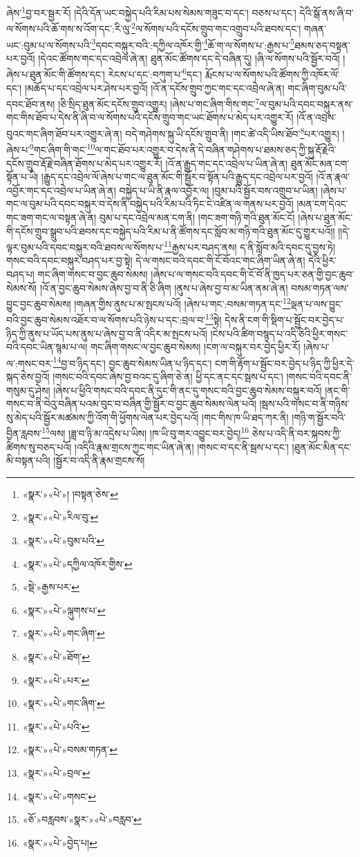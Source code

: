 ཞེས་\footnote{«སྣར་»«པེ་»། །བསྟན་ཅེས་}བྱ་བར་སྦྱར་རོ། །དེའི་དོན་ཡང་བསྐྱེད་པའི་རིམ་པས་སེམས་གཟུང་བ་དང་། བཅས་པ་དང་། དེའི་སྒོ་ནས་ཞི་བ་ལ་སོགས་པའི་ཆོ་གས་ས་འོག་དང་:རི་ལུ་\footnote{«སྣར་»«པེ་»རིལ་བུ་}ལ་སོགས་པའི་དངོས་གྲུབ་གང་འགྲུབ་པའི་ཐབས་དང་། གཞན་ཡང་:བུམ་པ་ལ་སོགས་པའི་\footnote{«སྣར་»«པེ་»བུམ་པའི་}དབང་བསྐུར་བའི་:དཀྱིལ་འཁོར་གྱི་\footnote{«སྣར་»«པེ་»དཀྱིལ་འཁོར་གྱིས་}ཆོ་ག་ལ་སོགས་པ་:རྒྱས་པ་\footnote{«སྡེ་»རྒྱས་པར་}ཐམས་ཅད་བསྟན་པར་བྱའོ། །དེའང་ཚོགས་གང་དང་འབྲེལ་ཞེ་ན། ཐུན་མོང་ཚོགས་དང་དེ་བཞིན་དུ། །ཞི་ལ་སོགས་པའི་སྦྱོར་བའོ། །ཞེས་པ་ཐུན་མོང་གི་ཚོགས་དང་། རེངས་པ་དང་:བཀུག་པ་\footnote{«སྣར་»«པེ་»ལྐུགས་པ་}དང་། རྨོངས་པ་ལ་སོགས་པའི་ཚོགས་ཀྱི་འཁོར་ལོ་དང་། །མཆོད་པ་དང་འབྲེལ་པར་ཤེས་པར་བྱའོ། །འོ་ན་དངོས་གྲུབ་ཀྱང་གང་དང་འབྲེལ་ཞེ་ན། གང་ཞིག་བུམ་པའི་དབང་ཐོབ་ནས། །ཅི་སྲིད་ཐུན་མོང་དངོས་གྲུབ་འགྱུར། །ཞེས་པ་གང་ཞིག་གིས་གང་\footnote{«སྣར་»«པེ་»གང་ཞིག་}ལ་བུམ་པའི་དབང་བསྐུར་ནས་གང་གིས་ཐོབ་པ་དེས་ནི་ཞི་བ་ལ་སོགས་པའི་དངོས་གྲུབ་གང་ཡང་ཐོགས་པ་མེད་པར་འགྱུར་རོ། །འོ་ན་འབྲས་བུའང་གང་ཞིག་ཐོབ་པར་འགྱུར་ཞེ་ན། བདེ་གཤེགས་སྐུ་ཡི་དངོས་གྲུབ་ནི། །གང་ཚེ་འདི་ཡིས་ཐོབ་\footnote{«སྣར་»«པེ་»ཐོག་}པར་འགྱུར། །ཞེས་པ་\footnote{«སྣར་»«པེ་»པར་}གང་ཞིག་གི་གང་\footnote{«སྣར་»«པེ་»གང་ཞིག་}ལ་གང་ཐོབ་པར་འགྱུར་བ་དེས་ནི་དེ་བཞིན་གཤེགས་པ་ཐམས་ཅད་ཀྱི་སྐུ་རྡོ་རྗེའི་དངོས་གྲུབ་རྡོ་རྗེ་བཞིན་ཐོགས་པ་མེད་པར་འགྱུར་རོ། །འོ་ན་རྒྱུད་གང་དང་འབྲེལ་པ་ཡིན་ཞེ་ན། ཐུན་མོང་མན་ངག་སྟོན་པ་ཡི། །རྒྱུད་དང་འབྲེལ་ལོ་ཞེས་པ་གང་ལ་ཐུན་མོང་གི་སྦྱོར་བ་སྟོན་པའི་རྒྱུད་དང་འབྲེལ་པར་བྱའོ། །འོ་ན་རྣལ་འབྱོར་གང་དང་འབྲེལ་པ་ཡིན་ཞེ་ན། བསྐྱེད་པ་ཡི་ནི་རྣལ་འབྱོར་ལ། །བུམ་པའི་སྦྱོར་བས་འགྲུབ་པ་ཡིན། །ཞེས་པ་གང་ལ་བུམ་པའི་དབང་བསྐུར་བ་དེས་ནི་བསྐྱེད་པའི་རིམ་པའི་ཏིང་ངེ་འཛིན་ལ་གནས་པར་བྱའོ། །མན་ངག་དེའང་གང་ཟག་གང་ལ་བསྟན་ཞེ་ན། བུམ་པ་དང་འབྲེལ་མན་ངག་ནི། །གང་ཟག་གཉི་གའི་ཐུན་མོང་ངོ། །ཞེས་པ་ཐུན་མོང་གི་དངོས་གྲུབ་སྒྲུབ་པའི་ཐབས་དང་བསྐྱེད་པའི་རིམ་པ་ནི་ཚོགས་དང་སློབ་མ་གཉི་གའི་ཐུན་མོང་དུ་གྱུར་པའོ།། །།དེ་ལྟར་བུམ་པའི་དབང་བསྐུར་བའི་ཐབས་ལ་སོགས་པ་\footnote{«སྣར་»«པེ་»པའི་}རྒྱས་པར་བཤད་ནས། ད་ནི་སློབ་མའི་དབང་དུ་བྱས་ཏེ། གསང་བའི་དབང་བསྐུར་བཤད་པར་བྱ་སྟེ། དེ་ལ་གསང་བའི་དབང་གི་ངོ་བོའང་གང་ཞིག་ཡིན་ཞེ་ན། དེའི་ཕྱིར་བཤད་པ། གང་ཞིག་གསང་བ་བྱང་ཆུབ་སེམས། །ཞེས་པ་ལ་གསང་བའི་དབང་གི་ངོ་བོ་ནི་ཁྱད་པར་ཅན་གྱི་བྱང་ཆུབ་སེམས་སོ། །འོ་ན་བྱང་ཆུབ་སེམས་ཞེས་བྱ་བ་ནི་ཅི་ཞིག །ནུས་པ་ཞེས་བྱ་བ་མ་ཡིན་ནམ་ཞེ་ན། བསམ་གཏན་ལས་བྱུང་བྱང་ཆུབ་སེམས། །གཞན་གྱིས་ནུས་པ་མ་སྤངས་པའོ། །ཞེས་པ་གང་:བསམ་གཏན་དང་\footnote{«སྣར་»«པེ་»བསམ་གཏན་}ལྡན་པ་ལས་བྱུང་བའི་བྱང་ཆུབ་སེམས་འཐོར་བ་ལ་སོགས་པའི་ཉེས་པ་དང་:བྲལ་བ་\footnote{«སྣར་»«པེ་»བྲལ་}སྟེ། དེས་ནི་ངག་གི་སྡིག་པ་སྦྱོང་བར་བྱེད་པ་ཉིད་ཀྱི་ནུས་པ་ཡོད་པས་ནུས་པ་ཞེས་བྱ་བ་ནི་འདིར་མ་སྤངས་པའོ། །ངེས་པའི་ཚིག་བསྙད་པ་འདི་ཅིའི་ཕྱིར་གསང་བའི་དབང་ཡིན་སྙམ་པ་ལ། གང་ཞིག་གསང་ལ་བྱང་ཆུབ་སེམས། །ངག་ལ་བསྐུར་བར་བྱེད་ཕྱིར་རོ། །ཞེས་པ་ལ་:གསང་བར་\footnote{«སྣར་»«པེ་»གསང་}བྱ་བ་ཉིད་དང་། བྱང་ཆུབ་སེམས་ཡིན་པ་ཉིད་དང་། ངག་གི་རྟོག་པ་སྦྱོང་བར་བྱེད་པ་ཉིད་ཀྱི་ཕྱིར་དེ་སྐད་ཅེས་བྱའོ། །གསང་བའི་དབང་ཞེས་བྱ་བའང་དུ་ཞིག་ཅེ་ན། ཕྱི་དང་ནང་དང་སྦས་པ་དང་། །གསང་བའི་དབང་ནི་གསུམ་དུ་ཤེས། །ཞེས་པ་ཕྱིའི་གསང་བའི་དབང་ནི་དུང་གི་ནང་དུ་གསང་བའི་བྱང་ཆུབ་སེམས་བསྐུར་བའོ། །ནང་གི་གསང་བ་ནི་བེའུ་བཞིན་པའམ་བུང་བ་བཞིན་གྱི་སྦྱོར་བ་བྱང་ཆུབ་སེམས་ལེན་པའོ། །སྦས་པའི་གསང་བ་ནི་གཉིས་སུ་མེད་པའི་སྦྱོར་མཚམས་ཀྱི་འོག་གི་ཕྱོགས་ལེན་པར་བྱེད་པའོ། །གང་གིས་ཁ་ཡི་ཐད་ཀར་ནི། །གཉི་ག་སྦྱོར་བའི་བྱིན་རླབས་\footnote{«ཅོ་»བརླབས་«སྣར་»«པེ་»བརླབ་}ལས། །ཟླ་བ་ཉི་མ་འདྲེས་པ་ཡིས། །ཁ་ཡི་བུ་གར་འབྱུང་བར་བྱེད།\footnote{«སྣར་»«པེ་»བྱེད་པ།} ཅེས་པ་འདི་ནི་བར་སྐབས་ཀྱི་ཚིགས་སུ་བཅད་པའོ། །འདིའི་རྣམ་གྲངས་ཀྱང་གང་ཡིན་ཞེ་ན། །གསང་བ་དང་ནི་སྦས་པ་དང་། །ཐུན་མོང་མིན་དང་མི་བསྟན་པའི། །སྦྱོར་བ་འདི་ནི་རྣམ་གྲངས་སོ། 